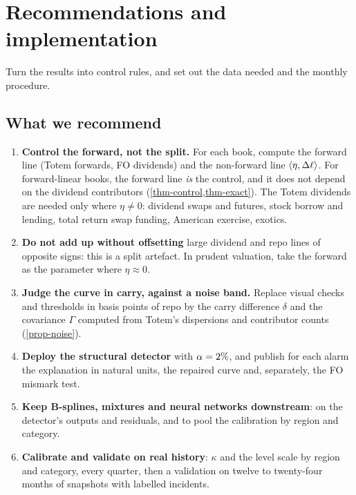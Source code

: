\section{Recommendations and implementation}\label{sec-reco}

\begin{objectif}
Turn the results into control rules, and set out the data needed and the monthly procedure.
\end{objectif}

\subsection{What we recommend}
\begin{enumerate}
\item \textbf{Control the forward, not the split.} For each book, compute the forward line (Totem forwards, FO
dividends) and the non-forward line $\langle \eta, \Delta\ell\rangle$. For forward-linear books, the forward line \emph{is}
the control, and it does not depend on the dividend contributors (\cref{thm-control,thm-exact}). The Totem dividends
are needed only where $\eta\ne0$: dividend swaps and futures, stock borrow and lending, total return swap funding,
American exercise, exotics.
\item \textbf{Do not add up without offsetting} large dividend and repo lines of opposite signs: this is a split
artefact. In prudent valuation, take the forward as the parameter where $\eta\approx0$.
\item \textbf{Judge the curve in carry, against a noise band.} Replace visual checks and thresholds in basis points
of repo by the carry difference $\delta$ and the covariance $\Gamma$ computed from Totem's dispersions and contributor
counts (\cref{prop-noise}).
\item \textbf{Deploy the structural detector} with $\alpha=\pct{2}$, and publish for each alarm the explanation in
natural units, the repaired curve and, separately, the FO mismark test.
\item \textbf{Keep B-splines, mixtures and neural networks downstream}: on the detector's outputs and residuals, and to
pool the calibration by region and category.
\item \textbf{Calibrate and validate on real history}: $\kappa$ and the level scale by region and category, every
quarter, then a validation on twelve to twenty-four months of snapshots with labelled incidents.
\end{enumerate}

